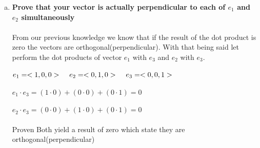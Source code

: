 \documentclass{article}
\begin{document}
\begin{enumerate}[c.]
\item\textbf{Prove that your vector is actually perpendicular to each of $e_{1}$ and $e_{2}$ simultaneously}\\
\\
From our previous knowledge we know that if the result of the dot product is zero the vectors are orthogonal(perpendicular). With that being said let perform the dot products of vector $e_{1}$ with $e_{3}$ and $e_{2}$ with $e_{3}$.\\
\\
$e_{1}=<1,0,0>\hspace{.4cm}e_{2}=<0,1,0>\hspace{.4cm}e_{3}=<0,0,1>$\\
\\
$e_{1} \cdot e_{3}=(1 \cdot 0) + (0 \cdot 0 ) + (0 \cdot 1) = 0$\\
\\
$e_{2} \cdot e_{3}=(0 \cdot 0) + (1 \cdot 0 ) + (0 \cdot 1) = 0$\\
\\
Proven Both yield a result of zero which state they are orthogonal(perpendicular)
\end{enumerate}
\end{document}
